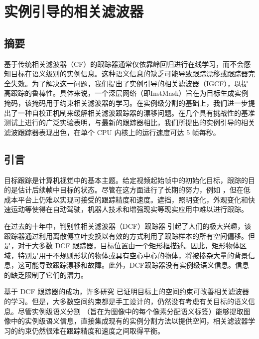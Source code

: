 \chapter{实例引导的相关滤波器}\label{chap:IGCF}

\section{摘要}
基于传统相关滤波器（CF）的跟踪器通常仅依靠岭回归进行在线学习，而不会感知目标在语义级别的实例信息。这种语义信息的缺乏可能导致跟踪漂移或跟踪器完全失效。为了解决这一问题，我们提出了实例引导的相关滤波器（IGCF），以提高跟踪的鲁棒性。具体来说，一个深层网络（即InstMask）旨在为目标生成实例掩码，该掩码用于约束相关滤波器的学习。在实例级分割的基础上，我们进一步提出了一种自校正机制来缓解相关滤波跟踪器的漂移问题。在几个具有挑战性的基准测试上进行的广泛实验表明，与最新的跟踪器相比，我们所提出的实例引导的相关滤波跟踪器表现出色，在单个 CPU 内核上的运行速度可达 5 帧每秒。

\section{引言}
目标跟踪是计算机视觉中的基本主题。给定视频起始帧中的初始化目标，跟踪的目的是估计后续帧中目标的状态。尽管在这方面进行了长期的努力，例如 \cite{Leang2018OnlineFO, Wang2019VisualOT, Zhang2018UsingFL}，但在低成本平台上仍难以实现可接受的跟踪精度和速度。遮挡，照明变化，外观变化和快速运动等使得在自动驾驶，机器人技术和增强现实等现实应用中难以进行跟踪。

在过去的十年中，判别性相关滤波器（DCF）跟踪器 \cite{bolme2010visual, Zhang2018VisualTU} 引起了人们的极大兴趣，该跟踪器通过利用离散傅立叶变换以有效的方式利用了跟踪样本的所有空间偏移。但是，对于大多数 DCF 跟踪器，目标位置由一个矩形框描述。因此，矩形物体区域，特别是用于不规则形状的物体或具有空心中心的物体，将被掺杂大量的背景信息，这可能导致跟踪漂移和故障。此外，DCF跟踪器没有实例级语义信息。信息的缺乏限制了它们的潜力。

基于 DCF 跟踪器的成功，许多研究 \cite{Danelljan2015LearningSR, Lukezic2017DiscriminativeCF} 已证明目标上的空间约束可改善相关滤波器的学习。但是，大多数空间约束都是手工设计的，仍然没有考虑有关目标的语义信息。尽管实例级语义分割 \cite{Pinheiro2015LearningTS, Zhang2019ProgressivelyDN}（旨在为图像中的每个像素分配语义标签）能够提取图像中的实例级语义信息，直接集成现有的实例分割方法以提供空间，相关滤波器学习的约束仍然很难在跟踪精度和速度之间取得平衡。


